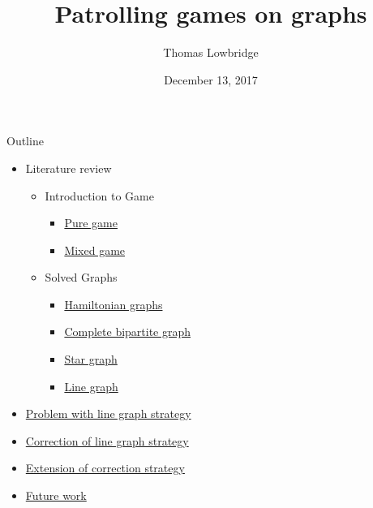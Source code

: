 \documentclass[11pt]{beamer}
\author{Thomas Lowbridge}
\title{Patrolling games on graphs}
\institute{University Of Nottingham}
\date{December 13, 2017}
\begin{document}
\hypertarget{Patrolling games}{}
\begin{frame}
\titlepage
\end{frame}


\begin{frame}{Outline}

\begin{itemize}
\item Literature review
 \begin{itemize}
 \item Introduction to Game
  \begin{itemize}
  \item \hyperlink{Introduction to game: Pure game}{Pure game}
  \item \hyperlink{Introduction to game: Mixed game}{Mixed game}
  \end{itemize}
 \item Solved Graphs
  \begin{itemize}
  \item \hyperlink{Solved graphs: Hamiltonian graphs}{Hamiltonian graphs}
  \item \hyperlink{Solved graphs: Complete bipartite graphs}{Complete bipartite graph}
  \item \hyperlink{Solved graphs: Star graph}{Star graph}
  \item \hyperlink{Solved graphs: Line graph}{Line graph}
  \end{itemize}   
 \end{itemize}
\item \hyperlink{Problem with diametricstrategy}{Problem with line graph strategy}
\item \hyperlink{Correction of diametric line graph strategy}{Correction of line graph strategy}
\item \hyperlink{Extension of correction strategy}{Extension of correction strategy}
\item \hyperlink{Future work}{Future work}
\end{itemize}
\end{frame}
\end{document}
